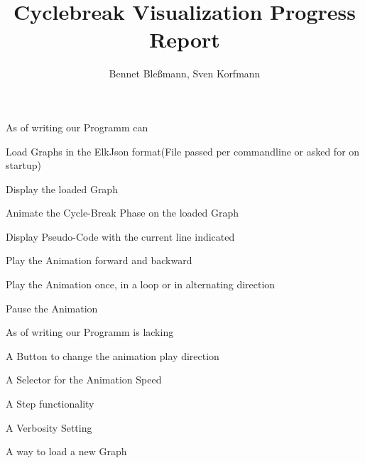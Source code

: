 \documentclass[12pt,a4paper]{article}
\author{Bennet Bleßmann, Sven Korfmann}
\title{Cyclebreak Visualization Progress Report}
\begin{document}
\maketitle

As of writing our Programm can
\begin{list}{-}{}
\item Load Graphs in the ElkJson format(File passed per commandline or asked for on startup)
\item Display the loaded Graph
\item Animate the Cycle-Break Phase on the loaded Graph
\item Display Pseudo-Code with the current line indicated
\item Play the Animation forward and backward
\item Play the Animation once, in a loop or in alternating direction
\item Pause the Animation
\item 

\end{list}

As of writing our Programm is lacking
\begin{list}{-}{}
\item A Button to change the animation play direction
\item A Selector for the Animation Speed 
\item A Step functionality
\item A Verbosity Setting
\item A way to load a new Graph
\end{list}
\end{document}
